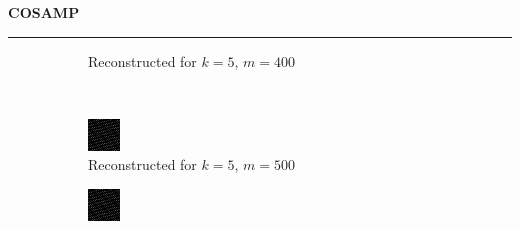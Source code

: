 \documentclass[a4paper,12pt]{article}
\newenvironment{solution}[2][]{%
    \begin{mdframed}[linecolor=blue!70!black, linewidth=2pt, roundcorner=10pt, backgroundcolor=yellow!10!white, skipabove=12pt, skipbelow=12pt]%
        \textbf{\large #2}
        \par\noindent\rule{\textwidth}{0.4pt}
}{
    \end{mdframed}
}
\begin{document}
\begin{solution}{COSAMP}
\begin{figure}[H]
\begin{subfigure}[t]{0.23\textwidth}
            \caption{Reconstructed for $k = 5$, $m = 400$}
        \end{subfigure}\\
        \begin{subfigure}[t]{0.23\textwidth}
            \centering
            \includegraphics[width=\textwidth]{../images/cosamp/Reconstructed_k_5_m_500.png}
            \caption{Reconstructed for $k = 5$, $m = 500$}
        \end{subfigure}
        \begin{subfigure}[t]{0.23\textwidth}
            \centering
            \includegraphics[width=\textwidth]{../images/cosamp/Reconstructed_k_5_m_600.png}

\end{subfigure}
\end{figure}
\end{solution}
\end{document}
